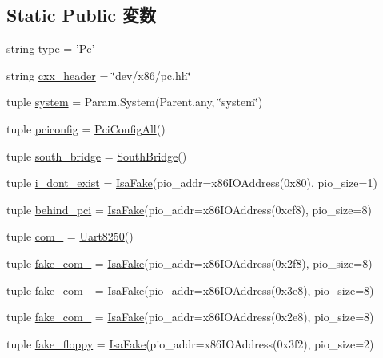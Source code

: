 \subsection*{Static Public 変数}
\begin{DoxyCompactItemize}
\item 
string \hyperlink{classPc_1_1Pc_acce15679d830831b0bbe8ebc2a60b2ca}{type} = '\hyperlink{classPc_1_1Pc}{Pc}'
\item 
string \hyperlink{classPc_1_1Pc_a17da7064bc5c518791f0c891eff05fda}{cxx\_\-header} = \char`\"{}dev/x86/pc.hh\char`\"{}
\item 
tuple \hyperlink{classPc_1_1Pc_ab737471139f5a296e5b26e8a0e1b0744}{system} = Param.System(Parent.any, \char`\"{}system\char`\"{})
\item 
tuple \hyperlink{classPc_1_1Pc_af76b12e7e603a8ef5f908080bb3e6fab}{pciconfig} = \hyperlink{classPciConfigAll}{PciConfigAll}()
\item 
tuple \hyperlink{classPc_1_1Pc_ae171c2c77850539ffbcb383111d1ef6a}{south\_\-bridge} = \hyperlink{classSouthBridge}{SouthBridge}()
\item 
tuple \hyperlink{classPc_1_1Pc_a458a45ec6ef2d8ac36ab638a4e51ae23}{i\_\-dont\_\-exist} = \hyperlink{classIsaFake}{IsaFake}(pio\_\-addr=x86IOAddress(0x80), pio\_\-size=1)
\item 
tuple \hyperlink{classPc_1_1Pc_a6ac8b3a3805c08896b06e8e48e3dea5a}{behind\_\-pci} = \hyperlink{classIsaFake}{IsaFake}(pio\_\-addr=x86IOAddress(0xcf8), pio\_\-size=8)
\item 
tuple \hyperlink{classPc_1_1Pc_a5dd9bce9d6b4a3436f223b46176c59bb}{com\_} = \hyperlink{classUart8250}{Uart8250}()
\item 
tuple \hyperlink{classPc_1_1Pc_a99f7bdc1effd02a5b4cfe1fa1bbe6423}{fake\_\-com\_} = \hyperlink{classIsaFake}{IsaFake}(pio\_\-addr=x86IOAddress(0x2f8), pio\_\-size=8)
\item 
tuple \hyperlink{classPc_1_1Pc_a0619d8ae413c1a62cd9564fd80532a23}{fake\_\-com\_} = \hyperlink{classIsaFake}{IsaFake}(pio\_\-addr=x86IOAddress(0x3e8), pio\_\-size=8)
\item 
tuple \hyperlink{classPc_1_1Pc_a8c33088f1791dbb88161395c32705864}{fake\_\-com\_} = \hyperlink{classIsaFake}{IsaFake}(pio\_\-addr=x86IOAddress(0x2e8), pio\_\-size=8)
\item 
tuple \hyperlink{classPc_1_1Pc_a201a3870119ab6c7641e943a9216b0c1}{fake\_\-floppy} = \hyperlink{classIsaFake}{IsaFake}(pio\_\-addr=x86IOAddress(0x3f2), pio\_\-size=2)
\end{DoxyCompactItemize}


